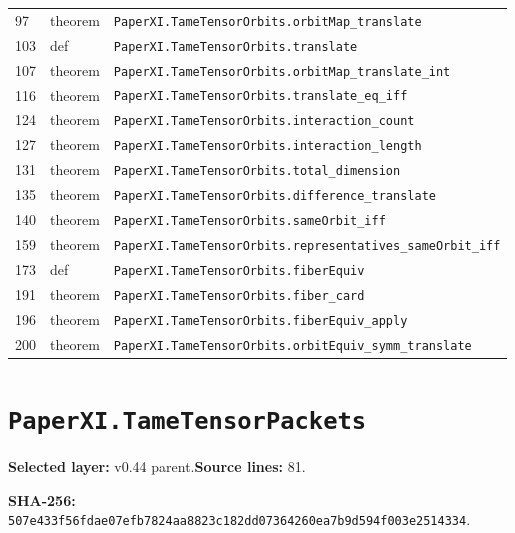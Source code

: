 \documentclass[10pt,oneside]{book}
\begin{document}
\begin{longtable}{@{}p{}p{}p{}@{}}
97&theorem&\nolinkurl{PaperXI.TameTensorOrbits.orbitMap_translate}\\

103&def&\nolinkurl{PaperXI.TameTensorOrbits.translate}\\

107&theorem&\nolinkurl{PaperXI.TameTensorOrbits.orbitMap_translate_int}\\

116&theorem&\nolinkurl{PaperXI.TameTensorOrbits.translate_eq_iff}\\

124&theorem&\nolinkurl{PaperXI.TameTensorOrbits.interaction_count}\\

127&theorem&\nolinkurl{PaperXI.TameTensorOrbits.interaction_length}\\

131&theorem&\nolinkurl{PaperXI.TameTensorOrbits.total_dimension}\\

135&theorem&\nolinkurl{PaperXI.TameTensorOrbits.difference_translate}\\

140&theorem&\nolinkurl{PaperXI.TameTensorOrbits.sameOrbit_iff}\\

159&theorem&\nolinkurl{PaperXI.TameTensorOrbits.representatives_sameOrbit_iff}\\

173&def&\nolinkurl{PaperXI.TameTensorOrbits.fiberEquiv}\\

191&theorem&\nolinkurl{PaperXI.TameTensorOrbits.fiber_card}\\

196&theorem&\nolinkurl{PaperXI.TameTensorOrbits.fiberEquiv_apply}\\

200&theorem&\nolinkurl{PaperXI.TameTensorOrbits.orbitEquiv_symm_translate}\\

\bottomrule\end{longtable}

\section{\texorpdfstring{\nolinkurl{PaperXI.TameTensorPackets}}{PaperXI.TameTensorPackets}}\label{module:PaperXI.TameTensorPackets}

\textbf{Selected layer:} v0.44 parent.\quad\textbf{Source lines:} 81.\par\textbf{SHA-256:} {\scriptsize\nolinkurl{507e433f56fdae07efb7824aa8823c182dd07364260ea7b9d594f003e2514334}}.
\end{document}
